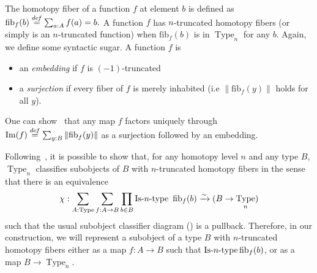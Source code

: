\documentclass[notfinal]{jfrarticle}
\DeclareMathOperator{\Type}{Type}
\DeclareMathOperator{\im}{Im}
\newcommand \defeq {\overset{de\hspace{-0.2ex}f}{=}}
\def\mymathhyphen{{\hbox{-}}}
\newcommand{\IsType}[1]
{\mathop{\mathrm{Is\mymathhyphen}#1\mathrm{\mymathhyphen type}} }
\newcommand \fib[2] {\mathrm{fib}_{#1}(#2)}
\begin{document}
%
The homotopy fiber of a function $f$ at element $b$ is
defined as 
$
\fib{f}{b} \defeq \sum_{a:A} f(a) = b.
$
%
A function $f$ has $n$-truncated homotopy fibers (or simply
is an $n$-truncated function) when $\fib{f}{b}$
is in $\Type_n$ for any $b$.  
%
Again, we define some syntactic sugar. A function $f$ is 
\begin{itemize}
\item an {\em embedding} if $f$ is $(-1)$-truncated
\item a {\em surjection} if every fiber of $f$ is merely inhabited
  (i.e $\|\fib f y\|$ holds for all $y$).
\end{itemize}
One can show~\cite[Lemma 7.6.4]{hottbook} that any map $f$
factors uniquely through $\im(f) \defeq \sum_{y:B} \|\fib f y\|$ as a
surjection followed by an embedding.

Following~\cite{sets_in_hott}, it is possible to show that, for any
homotopy level $n$ and any type $B$, $\Type_n$ classifies subobjects
of $B$ with $n$-truncated homotopy fibers in the sense that there is
an equivalence
%
\[
  \chi : \sum_{A:\Type} \sum_{f:A \to B} \prod_{b\in B}
\IsType n\
\fib{f}{b} \xrightarrow{\sim} 
 (B \to \Type_n)
\]
%
 such that the usual subobject
 classifier diagram (\cite[Theorem 4.8.4]{hottbook}) is a pullback.
Therefore, in our construction, we will represent a subobject of a
type $B$ with $n$-truncated homotopy fibers either as a map $f:A\to B$
such that $\IsType n \fib{f}{b}$, or as a map $B\to \Type_n$.


\end{document}
